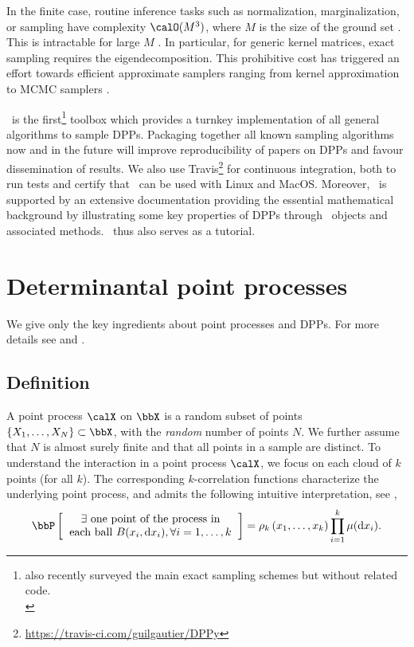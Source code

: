 \documentclass[twoside,11pt]{article}
\begin{document}
 In the finite case, routine inference tasks such as normalization, marginalization,  or sampling have complexity $\calO(M^3)$, where $M$ is the size of the ground set \citep{KuTa12}. This is  intractable for large $M$ \citep{Gil14}. 
  In particular, for generic kernel matrices, exact sampling requires the eigendecomposition. 
  This prohibitive cost has triggered an effort towards efficient approximate samplers ranging from kernel approximation \citep{AKFT13} to MCMC samplers \citep{AnGhRe16, LiJeSr16c, GaBaVa17}.
  
  \DPPy\ is the first\footnote{\citet{TrBaAm18} also recently surveyed the main exact sampling schemes but without related code.\\}
 toolbox which provides a turnkey implementation of all general algorithms to sample DPPs.  Packaging together all known sampling algorithms now and in the future will improve reproducibility of papers on DPPs and favour dissemination of results.
  \setcounter{footnote}{5}
  We also use Travis\footnote{\url{https://travis-ci.com/guilgautier/DPPy}} for continuous integration, both to run tests and certify that \DPPy\ can be used with Linux and MacOS. 
  Moreover, \DPPy\ is supported by an extensive documentation providing the essential mathematical background by illustrating some key properties of DPPs through \DPPy\ objects and associated methods.
  \DPPy\ thus also serves as a tutorial.


\section{Determinantal point processes} %
\label{sec:determinantal_point_processes}

We give only the key ingredients about point processes and DPPs. For more details see \citet{DaVe03} and \citet{HKPV06}.

  \subsection{Definition} %
  \label{sub:definition}

    A point process $\calX$ on $\bbX$ is a random subset of points $\lrcb{X_1, \dots, X_N} \subset \bbX$, with the \emph{random} number of points $N$. We further assume that $N$ is almost surely finite and that all points in a sample are distinct.
    To understand the interaction in a point process $\calX$, we focus on each cloud of $k$ points (for all $k$). 
    The corresponding $k$-correlation functions characterize the underlying point process, and admits the following intuitive interpretation, see \citet[Section 4]{MoWa04},
    \begin{equation}
    	\Proba{
    		\begin{tabular}{c}
    			$\exists$ one point of the process in\\
    			each ball $B(x_i, \diff x_i), \forall i=1,\dots, k $
    		\end{tabular}
    	}
    	= \rho_k\lrp{x_1,\dots,x_k}
    		\prod_{i=1}^k \mu(\diff x_i).
    \end{equation}
\end{document}
